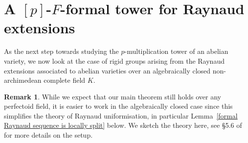 \documentclass[10pt,oneside]{amsart}
\newtheorem{corollary}[theorem]{Corollary}
\theoremstyle{definition}
\newtheorem{remark}[theorem]{Remark}
\begin{document}
\begin{comment}
	\begin{corollary}\label{action on formal model of torus}
		Let $T$ be any split torus over $K$. For any $q\in K^\times$ with $|q|<1$, the formal completion $\overline{T}$ has a natural action on $\mathfrak T_q$ via a map
		\[\mathfrak m:\overline{T}\times \mathfrak T_q\rightarrow \mathfrak T_q.\]
		This map is a formal model of the action of the annulus $\overline{T}$ on $T$. Furthermore, this action is compatible with the models for $[p]$ in the sense that if there is a $p$-th root $q^{1/p}\in K$, then the map $[\mathfrak p]:\mathfrak T_q^{1/p}\rightarrow \mathfrak T_q$ is semi-linear with respect to $[p]:\overline{T}\rightarrow \overline{T}$.
	\end{corollary} 
	
        
        \end{comment}
	
	

	\section{A $[p]$-$F$-formal tower for Raynaud extensions}\label{Raynaud extensions as principal bundles of formal and rigid spaces}
	As the next step towards studying the $p$-multiplication tower of an abelian variety, we now look at the case of rigid groups arising from the Raynaud extensions associated to abelian varieties over an algebraically closed non-archimedean complete field $K$.
	
	\begin{remark}
	While we expect that our main theorem still holds over any perfectoid field, it is easier to work in the algebraically closed case since this simplifies the theory of Raynaud uniformisation, in particular Lemma~\ref{formal Raynaud sequence is locally split} below.	We sketch the theory here, see \S 5.6 of \cite{rigid geometry of curves} for more details on the setup.
	\end{remark}
	
	
\end{document}
